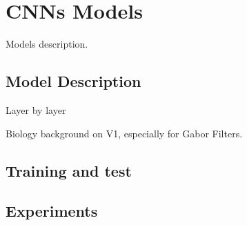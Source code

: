 \chapter{CNNs Models}
\label{cha:cnn}
Models description.

\section{Model Description}
\label{sec:mds}
Layer by layer

Biology background on V1, especially for Gabor Filters.

\section{Training and test}
\label{sec:tat}

\section{Experiments}
\label{sec:exp}